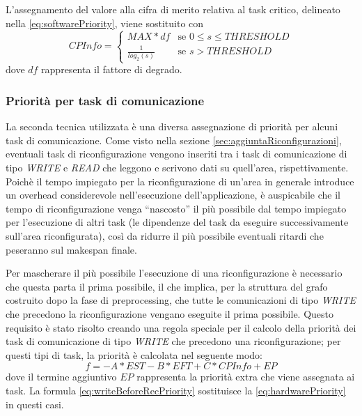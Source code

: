 L'assegnamento del valore alla cifra di merito relativa al task critico, 
delineato nella \ref{eq:softwarePriority}, viene sostituito con
\begin{equation} \label{eq:newSoftwarePriority}
 CPInfo = \begin{cases}
           MAX*df & \mbox{se } 0 \leq s \leq THRESHOLD\\
           \frac{1}{log_2\left(s\right)} & \mbox{se } s > THRESHOLD
           \end{cases}
\end{equation}
dove $df$ rappresenta il fattore di degrado.

\subsubsection{Priorità per task di comunicazione}
La seconda tecnica utilizzata è una diversa assegnazione di priorità per alcuni 
task di comunicazione. Come visto nella sezione 
\ref{sec:aggiuntaRiconfigurazioni}, eventuali task di riconfigurazione vengono 
inseriti tra i task di comunicazione di tipo \emph{WRITE} e \emph{READ} che 
leggono e scrivono dati su quell'area, rispettivamente. Poichè il tempo 
impiegato per la riconfigurazione di un'area in generale introduce un 
overhead considerevole nell'esecuzione dell'applicazione, è auspicabile che 
il tempo di riconfigurazione venga ``nascosto'' il più possibile dal tempo 
impiegato per l'esecuzione di altri task (le dipendenze del task da eseguire 
successivamente sull'area riconfigurata), così da ridurre il più possibile eventuali
ritardi che peseranno sul makespan finale.

Per mascherare il più possibile l'esecuzione di una riconfigurazione è 
necessario che questa parta il prima possibile, il che implica, per la 
struttura del grafo costruito dopo la fase di preprocessing, che tutte le 
comunicazioni di tipo \emph{WRITE} che precedono la riconfigurazione vengano 
eseguite il prima possibile. Questo requisito è stato risolto creando una 
regola speciale per il calcolo della priorità dei task di comunicazione di tipo 
\emph{WRITE} che precedono una riconfigurazione; per questi tipi di task, la 
priorità è calcolata nel seguente modo:
\begin{equation} \label{eq:writeBeforeRecPriority}
 f=-A*EST - B*EFT + C*CPInfo + EP
\end{equation}
dove il termine aggiuntivo $EP$ rappresenta la priorità extra che viene 
assegnata ai task. La formula \ref{eq:writeBeforeRecPriority} sostituisce la 
\ref{eq:hardwarePriority} in questi casi.


